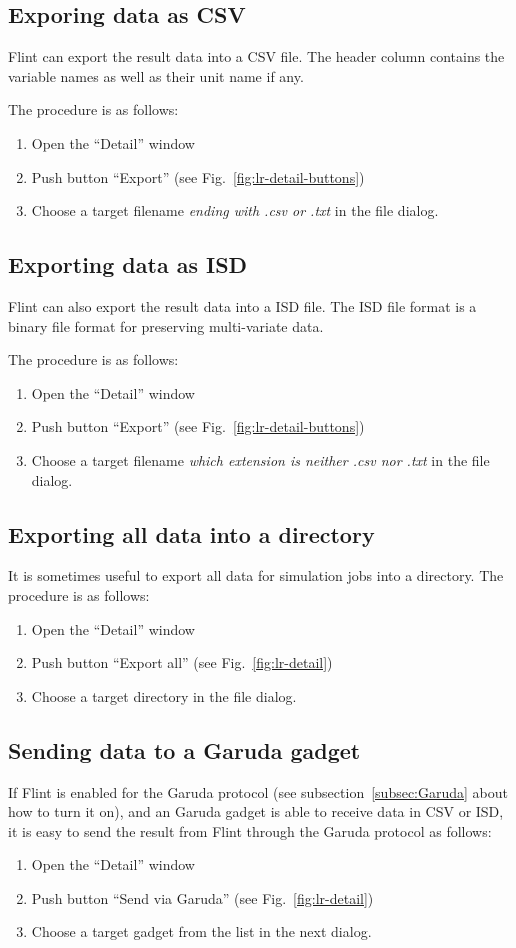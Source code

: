 \documentclass[a4paper,10pt]{report}
\begin{document}
\subsection{Exporing data as CSV}
Flint can export the result data into a CSV file.
The header column contains the variable names as well as their unit name if any.

The procedure is as follows:
\begin{enumerate}
\item Open the ``Detail'' window
\item Push button ``Export'' (see Fig.~\ref{fig:lr-detail-buttons})
\item Choose a target filename \emph{ending with .csv or .txt} in the file dialog.
\end{enumerate}

\subsection{Exporting data as ISD}
Flint can also export the result data into a ISD file.
The ISD file format is a binary file format for preserving multi-variate data.

The procedure is as follows:
\begin{enumerate}
\item Open the ``Detail'' window
\item Push button ``Export'' (see Fig.~\ref{fig:lr-detail-buttons})
\item Choose a target filename \emph{which extension is neither .csv nor .txt}
  in the file dialog.
\end{enumerate}

\subsection{Exporting all data into a directory}
It is sometimes useful to export all data for simulation jobs into a directory.
The procedure is as follows:
\begin{enumerate}
\item Open the ``Detail'' window
\item Push button ``Export all'' (see Fig.~\ref{fig:lr-detail})
\item Choose a target directory in the file dialog.
\end{enumerate}

\subsection{Sending data to a Garuda gadget}
If Flint is enabled for the Garuda protocol (see subsection~\ref{subsec:Garuda}
about how to turn it on), and an Garuda gadget is able to receive data in CSV or
ISD, it is easy to send the result from Flint through the Garuda protocol as
follows:
\begin{enumerate}
\item Open the ``Detail'' window
\item Push button ``Send via Garuda'' (see Fig.~\ref{fig:lr-detail})
\item Choose a target gadget from the list in the next dialog.
\end{enumerate}
\end{document}
